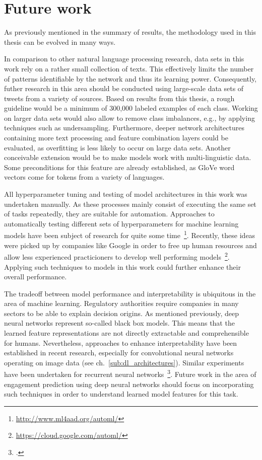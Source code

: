 \section{Future work}
\label{ch:future_work}

As previously mentioned in the summary of results, the methodology used in this
thesis can be evolved in many ways.

In comparison to other natural language processing research, data sets in this
work rely on a rather small collection of texts.
This effectively limits the number of patterns identifiable by the network and
thus its learning power.
Consequently, futher research in this area should be conducted using large-scale
data sets of tweets from a variety of sources.
Based on results from this thesis, a rough guideline would be a minimum
of 300,000 labeled examples of each class.
Working on larger data sets would also allow to remove class imbalances,
e.g., by applying techniques such as undersampling.
Furthermore, deeper network architectures containing more text processing
and feature combination layers could be evaluated, as overfitting is less likely
to occur on large data sets.
Another conceivable extension would be to make models work with multi-linguistic
data.
Some preconditions for this feature are already established, as GloVe word
vectors come for tokens from a variety of languages.

All hyperparameter tuning and testing of model architectures in this work was
undertaken manually.
As these processes mainly consist of executing the same set of tasks repeatedly,
they are suitable for automation.
Approaches to automatically testing different sets of hyperparameters for
machine learning models have been subject of research for quite some time~\footnote{\url{http://www.ml4aad.org/automl/}}.
Recently, these ideas were picked up by companies like Google in order to free
up human resources and allow less experienced practicioners to develop
well performing models~\footnote{\url{https://cloud.google.com/automl/}}.
Applying such techniques to models in this work could further enhance their
overall performance.

The tradeoff between model performance and interpretability is ubiquitous in
the area of machine learning.
Regulatory authorities require companies in many sectors to be able to explain
decision origins.
As mentioned previously, deep neural networks represent so-called black box models.
This means that the learned feature representations are not directly extractable
and comprehensible for humans.
Nevertheless, approaches to enhance interpretability have been established
in recent research, especially for convolutional neural networks operating
on image data (see ch.~\ref{sub:dl_architectures}).
Similar experiments have been undertaken for recurrent neural networks~\footcite{Karpathy2015}.
Future work in the area of engagement prediction using deep neural networks
should focus on incorporating such techniques in order to understand learned
model features for this task.

